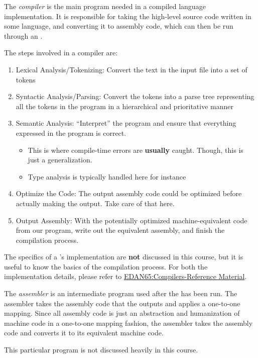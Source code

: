 \begin{definition}[Compiler]\label{def:Compiler}
  The \emph{compiler} is the main program needed in a compiled language implementation.
  It is responsible for taking the high-level source code written in some language, and converting it to assembly code, which can then be run through an .

  The steps involved in a compiler are:
  \begin{enumerate}[noitemsep]
  \item Lexical Analysis/Tokenizing: Convert the text in the input file into a set of tokens
  \item Syntactic Analysis/Parsing: Convert the tokens into a parse tree representing all the tokens in the program in a hierarchical and prioritative manner
  \item Semantic Analysis: ``Interpret'' the program and ensure that everything expressed in the program is correct.
    \begin{itemize}[noitemsep]
    \item This is where compile-time errors are \textbf{usually} caught. Though, this is just a generalization.
    \item Type analysis is typically handled here for instance
    \end{itemize}
    
  \item Optimize the Code: The output assembly code could be optimized before actually making the output. Take care of that here.
  \item Output Assembly: With the potentially optimized machine-equivalent code from our program, write out the equivalent assembly, and finish the compilation process.
  \end{enumerate}

  \begin{remark}
    The specifics of a 's implementation are \textbf{not} discussed in this course, but it is useful to know the basics of the compilation process.
    For both the implementation details, please refer to \href{run:./EDAN65-Compilers-Reference_Sheet.pdf}{EDAN65:Compilers-Reference Material}.
  \end{remark}
\end{definition}

\begin{definition}[Assembler]\label{def:Assembler}
  The \emph{assembler} is an intermediate program used after the  has been run.
  The assembler takes the assembly code that the  outputs and applies a one-to-one mapping.
  Since all assembly code is just an abstraction and humanization of machine code in a one-to-one mapping fashion, the assembler takes the assembly code and converts it to its equivalent machine code.

  \begin{remark}
    This particular program is not discussed heavily in this course.
  \end{remark}
\end{definition}

